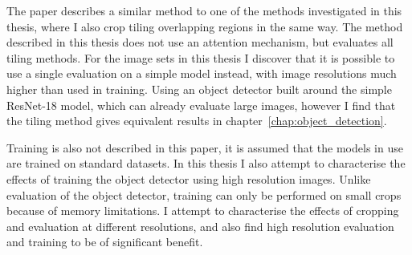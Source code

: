 The paper describes a similar method to one of the methods investigated in this thesis, where I also crop tiling overlapping regions in the same way. The method described in this thesis does not use an attention mechanism, but evaluates all tiling methods. For the image sets in this thesis I discover that it is possible to use a single evaluation on a simple model instead, with image resolutions much higher than used in training. Using an object detector built around the simple ResNet-18 model, which can already evaluate large images, however I find that the tiling method gives equivalent results in chapter~\ref{chap:object_detection}.
 
Training is also not described in this paper, it is assumed that the models in use are trained on standard datasets. In this thesis I also attempt to characterise the effects of training the object detector using high resolution images. Unlike evaluation of the object detector, training can only be performed on small crops because of memory limitations. I attempt to characterise the effects of cropping and evaluation at different resolutions, and also find high resolution evaluation and training to be of significant benefit.
